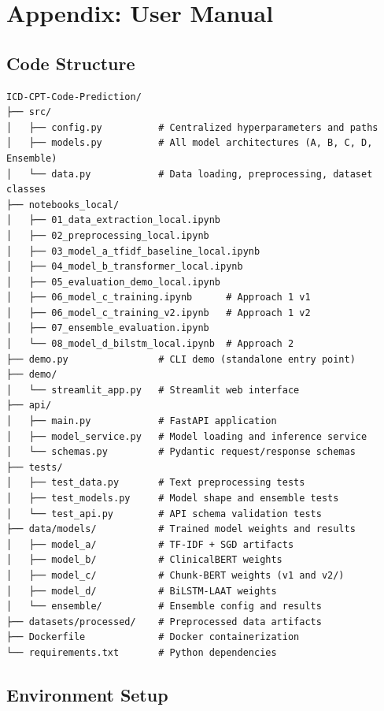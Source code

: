 \documentclass[11pt,a4paper]{article}
\begin{document}
\newpage
\appendix
\section{Appendix: User Manual}

\subsection{Code Structure}

\begin{verbatim}
ICD-CPT-Code-Prediction/
├── src/
│   ├── config.py          # Centralized hyperparameters and paths
│   ├── models.py          # All model architectures (A, B, C, D, Ensemble)
│   └── data.py            # Data loading, preprocessing, dataset classes
├── notebooks_local/
│   ├── 01_data_extraction_local.ipynb
│   ├── 02_preprocessing_local.ipynb
│   ├── 03_model_a_tfidf_baseline_local.ipynb
│   ├── 04_model_b_transformer_local.ipynb
│   ├── 05_evaluation_demo_local.ipynb
│   ├── 06_model_c_training.ipynb      # Approach 1 v1
│   ├── 06_model_c_training_v2.ipynb   # Approach 1 v2
│   ├── 07_ensemble_evaluation.ipynb
│   └── 08_model_d_bilstm_local.ipynb  # Approach 2
├── demo.py                # CLI demo (standalone entry point)
├── demo/
│   └── streamlit_app.py   # Streamlit web interface
├── api/
│   ├── main.py            # FastAPI application
│   ├── model_service.py   # Model loading and inference service
│   └── schemas.py         # Pydantic request/response schemas
├── tests/
│   ├── test_data.py       # Text preprocessing tests
│   ├── test_models.py     # Model shape and ensemble tests
│   └── test_api.py        # API schema validation tests
├── data/models/           # Trained model weights and results
│   ├── model_a/           # TF-IDF + SGD artifacts
│   ├── model_b/           # ClinicalBERT weights
│   ├── model_c/           # Chunk-BERT weights (v1 and v2/)
│   ├── model_d/           # BiLSTM-LAAT weights
│   └── ensemble/          # Ensemble config and results
├── datasets/processed/    # Preprocessed data artifacts
├── Dockerfile             # Docker containerization
└── requirements.txt       # Python dependencies
\end{verbatim}

\subsection{Environment Setup}
\end{document}
